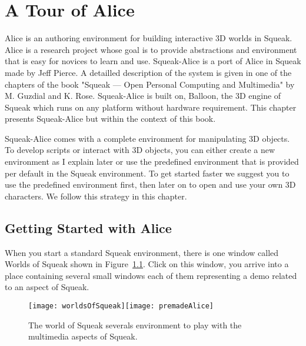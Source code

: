 \ifx\wholebook\relax\else



\fi


\chapter{A Tour of Alice}\label{cha:alice}

Alice is an authoring environment for building interactive 3D worlds in Squeak. Alice is a research project whose goal is to provide abstractions and environment that is easy for novices to learn and use.  Squeak-Alice is a port of Alice in Squeak made by Jeff Pierce. A detailled description of the system is given in one of the chapters of the book "Squeak --- Open Personal Computing and Multimedia" by M. Guzdial and K. Rose. Squeak-Alice is built on, Balloon, the 3D engine of Squeak which runs on any platform without hardware requirement.  This chapter presents Squeak-Alice but within the context of this book.  


Squeak-Alice comes with a complete environment for manipulating 3D objects. To develop scripts or interact with 3D objects, you can either create a new environment as I explain later or use the predefined environment that is provided per default in the Squeak environment. To get started faster we suggest you to use the predefined environment first, then later on to open and use your own 3D characters. We  follow this strategy in this chapter.

\section{Getting Started with Alice}

When you start a standard Squeak environment, there is one window called Worlds of Squeak shown in Figure~\ref{fig:worldOfSqueak}. Click on this window, you arrive into a place containing several small windows each of them representing a demo related to an aspect of Squeak. 

\begin{figure}[h]
\begin{center}\texttt{[image: worldsOfSqueak]}\hspace{0.5cm}\texttt{[image: premadeAlice]}\caption{The world of Squeak severals environment to play with the multimedia aspects of Squeak. \label{fig:worldOfSqueak}}\end{center}
\end{figure}

